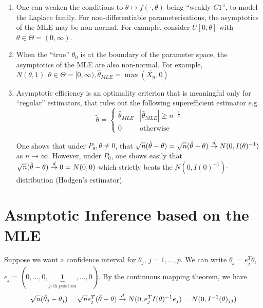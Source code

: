 \begin{remark}
  \begin{enumerate}
  \item One can weaken the conditions to $\theta \mapsto f(\cdot,
    \theta)$ being ``weakly $C1$'', to model the Laplace family. For
    non-differentiable parameterisations, the asymptotics of the MLE
    may be non-normal. For example, consider $U[0, \theta]$ with
    $\theta \in \Theta = (0, \infty)$.
  \item When the ``true'' $\theta_{0}$ is at the boundary of the
    parameter space, the asymptotics of the MLE are also non-normal.
    For example, $N(\theta, 1), \theta \in \Theta = [0, \infty), \hat
    \theta_{MLE} = \max(\overline{X_{n}}, 0)$
  \item Asymptotic efficiency is an optimality criterion that is
    meaningful only for ``regular'' estimators, that rules out the
    following superefficient estimator e.g.
    \begin{equation}
      \label{eq:67}
      \tilde \theta =
      \begin{cases}
        \hat \theta_{MLE} & |\hat \theta_{MLE}| \geq n^{-\frac{1}{4}} \\
        0 & \text{otherwise}
      \end{cases}
    \end{equation}

    One shows that under $P_{\theta}, \theta \neq 0$, that
    $\sqrt{n}(\tilde \theta - \theta) = \sqrt{n}(\hat \theta -
    \theta) \overset{d}{\rightarrow} N(0, I(\theta)^{-1})$ as $n \rightarrow \infty$.
    However, under $P_{0}$, one shows easily that $\sqrt{n}(\tilde
    \theta - \theta) \overset{d}{\rightarrow} 0 = N(0, 0)$ which strictly beats the $N(0,
    I(0)^{-1})$-distribution (Hodgen's estimator).
  \end{enumerate}
\end{remark}


\section{Asmptotic Inference based on the MLE}
\label{sec:asmpt-infer-based}

Suppose we want a confidence interval for $\theta_{j}$, $j = 1, \dots,
p$.   We can write $\theta_{j} = e_{j}^{T} \theta$, $e_{j} = (0,
\dots, 0, \underbrace{1}_{\text{$j$-th position}}, \dots, 0)$.  By the
continuous mapping theorem, we have
\begin{align}
  \label{eq:68}
  \sqrt{n} (\hat \theta_{j} - \theta_{j}) = \sqrt{n} e_{j}^{T}(\hat
  \theta - \theta) \overset{d}{\rightarrow} N(0, e_{j}^{T} I(\theta)^{-1}e_{j}) = N(0, I^{-1}(\theta)_{jj})
\end{align}


